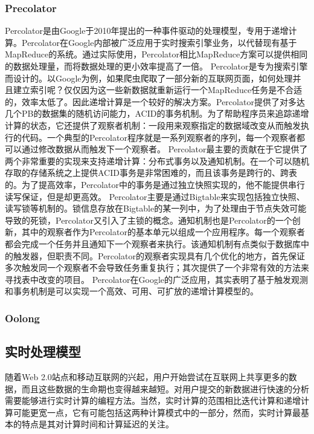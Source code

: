 \subsubsection{Precolator}
Percolator是由Google于2010年提出的一种事件驱动的处理模型，专用于递增计算。Percolator在Google内部被广泛应用于实时搜索引擎业务，以代替现有基于MapReduce的系统。通过实际使用，Percolator相比MapReduce方案可以提供相同的数据处理量，而将数据处理的更小效率提高了一倍。
  Percolator是专为搜索引擎而设计的。以Google为例，如果爬虫爬取了一部分新的互联网页面，如何处理并且建立索引呢？仅仅因为这一些新数据就重新运行一个MapReduce任务是不合适的，效率太低了。因此递增计算是一个较好的解决方案。Percolator提供了对多达几个PB的数据集的随机访问能力，ACID的事务机制。为了帮助程序员来追踪递增计算的状态，它还提供了观察者机制：一段用来观察指定的数据域改变从而触发执行的代码。一个典型的Percolator程序就是一系列观察者的序列，每一个观察者都可以通过修改数据从而触发下一个观察者。
  Percolator最主要的贡献在于它提供了两个非常重要的实现来支持递增计算：分布式事务以及通知机制。在一个可以随机存取的存储系统之上提供ACID事务是非常困难的，而且该事务是跨行的、跨表的。为了提高效率，Percolator中的事务是通过独立快照实现的，他不能提供串行读写保证，但是却更高效。 Percolator主要是通过Bigtable来实现包括独立快照、读写锁等机制的。锁信息存放在Bigtable的某一列中，为了处理由于节点失效可能导致的死锁，Percolator又引入了主锁的概念。通知机制也是Percolator的一个创新，其中的观察者作为Percolator的基本单元以组成一个应用程序。每一个观察者都会完成一个任务并且通知下一个观察者来执行。该通知机制有点类似于数据库中的触发器，但职责不同。Percolator的观察者实现具有几个优化的地方，首先保证多次触发同一个观察者不会导致任务重复执行；其次提供了一个非常有效的方法来寻找表中改变的项目。
  Percolator在Google的广泛应用，其实表明了基于触发观测和事务机制是可以实现一个高效、可用、可扩放的递增计算模型的。

\subsubsection{Oolong}
\subsection{实时处理模型}
随着Web 2.0站点和移动互联网的兴起，用户开始尝试在互联网上共享更多的数据，而且这些数据的生命期也变得越来越短。对用户提交的新数据进行快速的分析需要能够进行实时计算的编程方法。当然，实时计算的范围相比迭代计算和递增计算可能更宽一点，它有可能包括这两种计算模式中的一部分，然而，实时计算最基本的特点是其对计算时间和计算延迟的关注。


